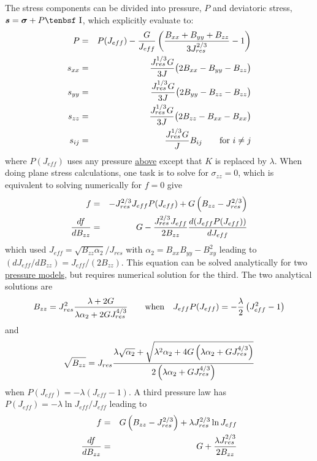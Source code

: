 \documentclass[11pt]{book}
\renewcommand{\vec}[1]{\boldsymbol{#1}}
\def\I{\hbox{\tenbsf I}}
\def\Jeff{J_{eff}}
\def\Jres{J_{res}}
\begin{document}
The stress components can be divided into pressure, $P$ and deviatoric stress, $\vec s = \vec\sigma+P\I$, which explicitly evaluate to:
\begin{eqnarray}
     P & = & P(\Jeff) - {G\over \Jeff}\left({B_{xx}+B_{yy}+B_{zz}\over 3\Jres^{2/3}}-1\right) \\
     s_{xx} & = & {\Jres^{1/3}G\over 3J}\bigl(2B_{xx}-B_{yy}-B_{zz}\bigr) \\
     s_{yy} & = & {\Jres^{1/3}G\over 3J}\bigl(2B_{yy}-B_{zz}-B_{zz}\bigr)  \\
     s_{zz} & = & {\Jres^{1/3}G\over 3J}\bigl(2B_{zz}-B_{xx}-B_{xx}\bigr)  \\
     s_{ij} & = & {\Jres^{1/3}G\over J}B_{ij} \qquad {\rm for}\ i\ne j
\end{eqnarray}
where $P(\Jeff)$ uses any pressure \hyperref[PTerms]{above} except that $K$ is replaced by $\lambda$.
When doing plane stress calculations, one task is to solve for $\sigma_{zz}=0$, which is equivalent to solving numerically for $f=0$ give
\begin{eqnarray}
     f & = & -  \Jres^{2/3}\Jeff P(\Jeff) + G\left(B_{zz}-\Jres^{2/3}\right) \\
     {df\over dB_{zz}} & = & G - {\Jres^{2/3}\Jeff\over 2B_{zz}}{d(\Jeff P(\Jeff))\over d\Jeff}
\end{eqnarray}
which used $J_{eff} = \sqrt{B_{zz}\alpha_2}/J_{res}$ with $\alpha_2 = B_{xx}B_{yy}-B_{xy}^2$ leading to $(dJ_{eff}/ dB_{zz}) = \Jeff/(2B_{zz})$. This equation can be solved analytically for two \hyperref[PTerms]{pressure models}, but requires numerical solution for the third. The two analytical solutions are
\begin{equation}
     B_{zz} = \Jres^2{ \lambda + 2G \over  \lambda \alpha_2 + 2G \Jres^{4/3}}     \qquad {\rm when} \quad \Jeff P(\Jeff) = -{\lambda\over2}\left(\Jeff^2 - 1\right)
\end{equation}
and
\begin{equation}
     \sqrt{B_{zz}} =  \Jres {\lambda\sqrt{\alpha_2}+\sqrt{\lambda^2\alpha_2 + 4G\left(\lambda\alpha_2 + G\Jres^{4/3}\right)} 
                  \over 2\left(\lambda\alpha_2 + G\Jres^{4/3}\right)}
\end{equation}
when $P(\Jeff) = -\lambda\left(\Jeff - 1\right)$. A third pressure law has $P(\Jeff) = -\lambda \ln \Jeff/\Jeff$ leading to
\begin{eqnarray}
     f & = & G \left(B_{zz} - \Jres^{2/3}\right) + \lambda \Jres^{2/3}\ln\Jeff   \\
     {df\over dB_{zz}} & = & G + {\lambda\Jres^{2/3}\over 2B_{zz}}
\end{eqnarray}
\end{document}
